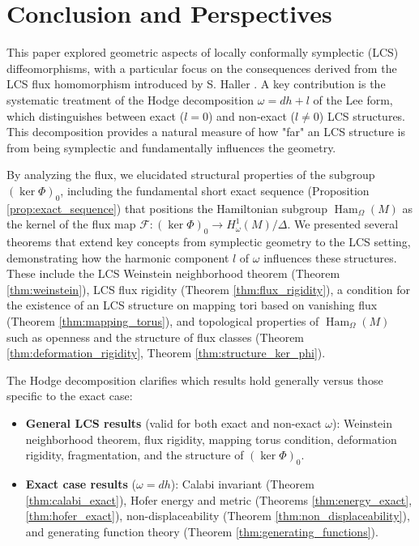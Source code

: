 \documentclass[11pt,a4paper]{amsart}
\theoremstyle{definition}
\theoremstyle{remark}
\newcommand{\Ham}{\operatorname{Ham}}
\begin{document}
	\section{Conclusion and Perspectives}
	
	This paper explored geometric aspects of locally conformally symplectic (LCS) diffeomorphisms, with a particular focus on the consequences derived from the LCS flux homomorphism introduced by S. Haller \cite{Haller2005}. A key contribution is the systematic treatment of the Hodge decomposition $\omega = dh + l$ of the Lee form, which distinguishes between exact ($l=0$) and non-exact ($l\neq 0$) LCS structures. This decomposition provides a natural measure of how "far" an LCS structure is from being symplectic and fundamentally influences the geometry.
	
	By analyzing the flux, we elucidated structural properties of the subgroup $(\ker \Phi)_0$, including the fundamental short exact sequence (Proposition \ref{prop:exact_sequence}) that positions the Hamiltonian subgroup $\Ham_\Omega(M)$ as the kernel of the flux map $\mathcal{F} : (\ker \Phi)_0 \to H_\omega^1(M)/\Delta$. We presented several theorems that extend key concepts from symplectic geometry to the LCS setting, demonstrating how the harmonic component $l$ of $\omega$ influences these structures. These include the LCS Weinstein neighborhood theorem (Theorem \ref{thm:weinstein}), LCS flux rigidity (Theorem \ref{thm:flux_rigidity}), a condition for the existence of an LCS structure on mapping tori based on vanishing flux (Theorem \ref{thm:mapping_torus}), and topological properties of $\Ham_\Omega(M)$ such as openness and the structure of flux classes (Theorem \ref{thm:deformation_rigidity}, Theorem \ref{thm:structure_ker_phi}).
	
	The Hodge decomposition clarifies which results hold generally versus those specific to the exact case:
	\begin{itemize}
		\item \textbf{General LCS results} (valid for both exact and non-exact $\omega$): Weinstein neighborhood theorem, flux rigidity, mapping torus condition, deformation rigidity, fragmentation, and the structure of $(\ker \Phi)_0$.
		\item \textbf{Exact case results} ($\omega = dh$): Calabi invariant (Theorem \ref{thm:calabi_exact}), Hofer energy and metric (Theorems \ref{thm:energy_exact}, \ref{thm:hofer_exact}), non-displaceability (Theorem \ref{thm:non_displaceability}), and generating function theory (Theorem \ref{thm:generating_functions}).
	\end{itemize}
	
\end{document}
